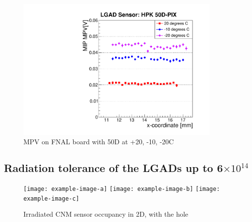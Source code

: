 \documentclass[preprint,1p]{elsarticle}
\begin{document}
\begin{figure}[htbp] 
\centering
\includegraphics[width=0.9\textwidth]{figs/FNAL_MPV_vs_X_HPK50D_TemperatureDependance.pdf} 
\caption{MPV on FNAL board with 50D at +20, -10, -20C} 
\label{fig:Sensors} 
\end{figure} 

\subsection{Radiation tolerance of the LGADs up to 6$\times 10^{14}$}

\begin{figure}[htbp] 
\centering
\texttt{[image: example-image-a]} 
\texttt{[image: example-image-b]} 
\texttt{[image: example-image-c]} 
\caption{Irradiated CNM sensor occupancy in 2D, with the hole} 
\label{fig:Sensors} 
\end{figure} 
\end{document}
